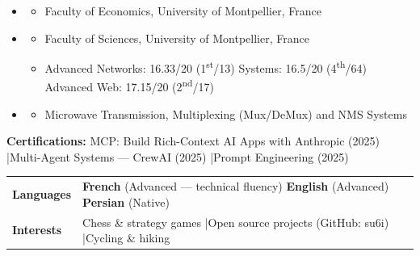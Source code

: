 \documentclass[11pt,a4paper]{article}
\renewcommand{\itemspace}{\vspace{0.2em}}
\begin{document}
\begin{itemize}[leftmargin=1em, label={}]
    \item
    \begin{itemize}[leftmargin=1.5em, label={\textbullet}, nosep]
        \item Faculty of Economics, University of Montpellier, France
    \end{itemize}

    \itemspace
    \item
    \begin{itemize}[leftmargin=1.5em, label={\textbullet}, nosep]
        \item Faculty of Sciences, University of Montpellier, France
        \item Advanced Networks: 16.33/20 (1\textsuperscript{st}/13) \quad Systems: 16.5/20 (4\textsuperscript{th}/64) \quad Advanced Web: 17.15/20 (2\textsuperscript{nd}/17)
    \end{itemize}

    \itemspace
    \item
    \begin{itemize}[leftmargin=1.5em, label={\textbullet}, nosep]
        \item Microwave Transmission, Multiplexing (Mux/DeMux) and NMS Systems
    \end{itemize}
\end{itemize}

\noindent\textbf{Certifications:} MCP: Build Rich-Context AI Apps with Anthropic (2025) \quad|\quad Multi-Agent Systems — CrewAI (2025) \quad|\quad Prompt Engineering (2025)

\noindent
\begin{tabularx}{\linewidth}{@{} p{3.5cm} X @{}}
\textbf{Languages} & \textbf{French} (Advanced — technical fluency) \quad \textbf{English} (Advanced) \quad \textbf{Persian} (Native) \\
\textbf{Interests} & Chess \& strategy games \quad|\quad Open source projects (GitHub: su6i) \quad|\quad Cycling \& hiking \\
\end{tabularx}
\end{document}
